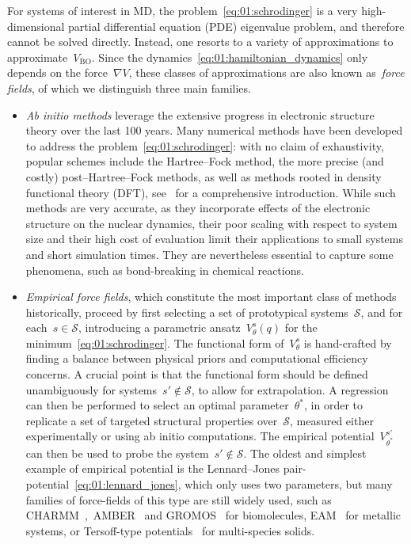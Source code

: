 For systems of interest in MD, the problem~\eqref{eq:01:schrodinger} is a very high-dimensional partial differential equation (PDE) eigenvalue problem, and therefore cannot be solved directly. Instead, one resorts to a variety of approximations to approximate~$V_{\mathrm{BO}}$.
Since the dynamics~\eqref{eq:01:hamiltonian_dynamics} only depends on the force~$\nabla V$, these classes of approximations are also known as~\textit{force fields}, of which we distinguish three main families.
\begin{itemize}
    \item{\textit{Ab initio methods} leverage the extensive progress in electronic structure theory over the last 100 years. Many numerical methods have been developed to address the problem~\eqref{eq:01:schrodinger}: with no claim of exhaustivity, popular schemes include the Hartree--Fock method, the more precise (and costly) post--Hartree--Fock methods, as well as methods rooted in density functional theory (DFT), see~\cite{J99} for a comprehensive introduction. While such methods are very accurate, as they incorporate effects of the electronic structure on the nuclear dynamics, their poor scaling with respect to system size and their high cost of evaluation limit their applications to small systems and short simulation times. They are nevertheless essential to capture some phenomena, such as bond-breaking in chemical reactions.}
    \item{\textit{Empirical force fields}, which constitute the most important class of methods historically, proceed by first selecting a set of prototypical systems~$\mathcal S$, and for each~$s\in\mathcal S$, introducing a parametric ansatz~$V^{s}_\theta(q)$ for the minimum~\eqref{eq:01:schrodinger}. The functional form of~$V^s_\theta$ is hand-crafted by finding a balance between physical priors and computational efficiency concerns. A crucial point is that the functional form should be defined unambiguously for systems~$s'\not\in\mathcal S$, to allow for extrapolation. A regression can then be performed to select an optimal parameter~$\theta^*$, in order to replicate a set of targeted structural properties over~$\mathcal S$, measured either experimentally or using ab initio computations. The empirical potential~$V_{\theta^*}^{s'}$ can then be used to probe the system~$s'\not\in\mathcal S$.
    The oldest and simplest example of empirical potential is the Lennard--Jones pair-potential~\eqref{eq:01:lennard_jones}, which only uses two parameters, but many families of force-fields of this type are still widely used, such as CHARMM~\cite{BBOSSK83},~AMBER~\cite{PCCRCDFSK95} and GROMOS~\cite{SHTMBFTHKVG99} for biomolecules, EAM~\cite{DB84} for metallic systems, or Tersoff-type potentials~\cite{T89} for multi-species solids.}

\end{itemize}
